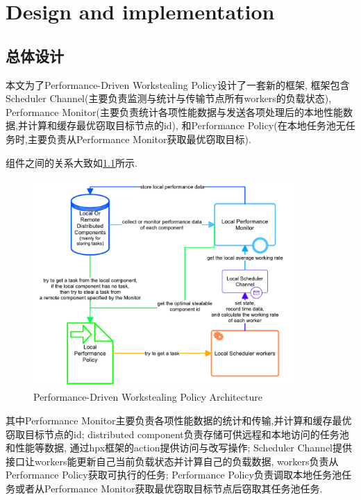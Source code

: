 \documentclass{mproj}
\begin{document}
\chapter{Design and implementation}

\section{总体设计}

本文为了Performance-Driven Workstealing Policy设计了一套新的框架,
框架包含Scheduler Channel(主要负责监测与统计与传输节点所有workers的负载状态),
Performance Monitor(主要负责统计各项性能数据与发送各项处理后的本地性能数据,并计算和缓存最优窃取目标节点的id),
和Performance Policy(在本地任务池无任务时,主要负责从Performance Monitor获取最优窃取目标).

组件之间的关系大致如\cref{fig:overall_architecture}所示.
\begin{figure}[h] %
    \centering %
    \includegraphics[width=0.9\textwidth]{images/overall_architecture.pdf} %
    \caption{Performance-Driven Workstealing Policy Architecture} %
    \label{fig:overall_architecture} %
\end{figure}
\FloatBarrier

其中Performance Monitor主要负责各项性能数据的统计和传输,并计算和缓存最优窃取目标节点的id;
distributed component负责存储可供远程和本地访问的任务池和性能等数据,
通过hpx框架的action提供访问与改写操作;
Scheduler Channel提供接口让workers能更新自己当前负载状态并计算自己的负载数据,
workers负责从Performance Policy获取可执行的任务;
Performance Policy负责调取本地任务池任务或者从Performance Monitor获取最优窃取目标节点后窃取其任务池任务.
\end{document}
